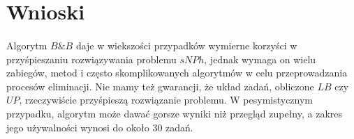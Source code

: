 \documentclass[wide,a4paper,titlepage,12pt] {article}
\begin{document}
\section{Wnioski}
\paragraph{}
Algorytm $B\&B$ daje w wiekszości przypadków wymierne korzyści w przyśpieszaniu rozwiązywania problemu $sNPh$, jednak wymaga on wielu zabiegów, metod i często skomplikowanych algorytmów w celu przeprowadzania procesów eliminacji. Nie mamy też gwarancji, że układ zadań, obliczone $LB$ czy $UP$, rzeczywiście przyśpieszą rozwiązanie problemu. W pesymistycznym przypadku, algorytm może dawać gorsze wyniki niż przegląd zupełny, a zakres jego używalności wynosi do około 30 zadań. 




	
\end{document}
